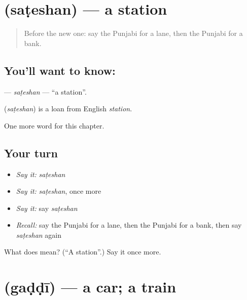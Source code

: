 \section[\texorpdfstring{\pa{ਸਟੇਸ਼ਨ} (saṭeshan)}{ਸਟੇਸ਼ਨ (saṭeshan)}]{ (saṭeshan) — a station}

\label{lesson:PA-C90-sateshan}



\begin{quote}
Before the new one: say the Punjabi for a lane, then the Punjabi for a bank.
\end{quote}

\subsection*{You'll want to know: }
\textbf{} — \emph{saṭeshan} — \textquotedblleft{}a station\textquotedblright{}.

\begin{cousinweb}
\textbf{} (\emph{saṭeshan}) is a loan from English \emph{station}.
\end{cousinweb}

\begin{grammarlens}[title={What you've built}]
One more word for this chapter.
\end{grammarlens}

\subsection*{Your turn}
\begin{itemize}
\raggedright
  \item \emph{Say it:} \emph{saṭeshan}
  \item \emph{Say it:} \emph{saṭeshan}, once more
  \item \emph{Say it:} say \emph{saṭeshan}
  \item \emph{Recall:} say the Punjabi for a lane, then the Punjabi for a bank, then say \emph{saṭeshan} again
\end{itemize}

\begin{tcolorbox}[breakable,colback=teal!4,colframe=teal!35!black,title={Before you move on}]
What does  mean? (\textquotedblleft{}A station\textquotedblright{}.) Say it once more.
\end{tcolorbox}
\section[\texorpdfstring{\pa{ਗੱਡੀ} (gaḍḍī)}{ਗੱਡੀ (gaḍḍī)}]{ (gaḍḍī) — a car; a train}

